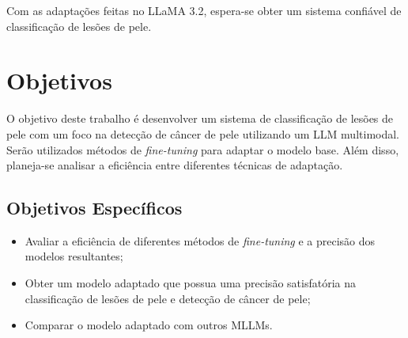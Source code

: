 Com as adaptações feitas no \ac{LLaMA} 3.2, espera-se obter um sistema confiável de classificação de lesões de pele.

\section{Objetivos}

O objetivo deste trabalho é desenvolver um sistema de classificação de lesões de pele com um foco na detecção de câncer de pele utilizando um \ac{LLM} multimodal.
Serão utilizados métodos de \textit{fine-tuning} para adaptar o modelo base. Além disso, planeja-se analisar a eficiência entre diferentes técnicas de adaptação.

\subsection*{Objetivos Específicos}

\begin{itemize}
    \item Avaliar a eficiência de diferentes métodos de \textit{fine-tuning} e a precisão dos modelos resultantes;
    \item Obter um modelo adaptado que possua uma precisão satisfatória na classificação de lesões de pele e detecção de câncer de pele;
    \item Comparar o modelo adaptado com outros \acp{MLLM}.
\end{itemize}
